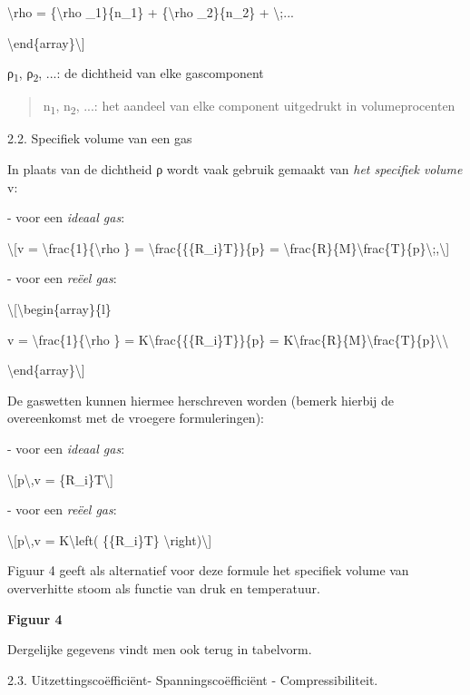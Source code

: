 \documentclass[]{article}
\begin{document}
\textbackslash{}rho = \{\textbackslash{}rho \_1\}\{n\_1\} +
\{\textbackslash{}rho \_2\}\{n\_2\} + \textbackslash{};...

\textbackslash{}end\{array\}\textbackslash{}{]}

ρ\textsubscript{1}, ρ\textsubscript{2}, ...: de dichtheid van elke
gascomponent

\begin{quote}
n\textsubscript{1}, n\textsubscript{2}, ...: het aandeel van elke
component uitgedrukt in volumeprocenten
\end{quote}

2.2. Specifiek volume van een gas

In plaats van de dichtheid ρ wordt vaak gebruik gemaakt van \emph{het
specifiek volume} v:

- voor een \emph{ideaal gas}:

\textbackslash{}{[}v = \textbackslash{}frac\{1\}\{\textbackslash{}rho \}
= \textbackslash{}frac\{\{\{R\_i\}T\}\}\{p\} =
\textbackslash{}frac\{R\}\{M\}\textbackslash{}frac\{T\}\{p\}\textbackslash{};,\textbackslash{}{]}

- voor een \emph{reëel gas}:

\textbackslash{}{[}\textbackslash{}begin\{array\}\{l\}

v = \textbackslash{}frac\{1\}\{\textbackslash{}rho \} =
K\textbackslash{}frac\{\{\{R\_i\}T\}\}\{p\} =
K\textbackslash{}frac\{R\}\{M\}\textbackslash{}frac\{T\}\{p\}\textbackslash{}\textbackslash{}

\textbackslash{}end\{array\}\textbackslash{}{]}

De gaswetten kunnen hiermee herschreven worden (bemerk hierbij de
overeenkomst met de vroegere formuleringen):

- voor een \emph{ideaal gas}:

\textbackslash{}{[}p\textbackslash{},v = \{R\_i\}T\textbackslash{}{]}

- voor een \emph{reëel gas}:

\textbackslash{}{[}p\textbackslash{},v = K\textbackslash{}left(
\{\{R\_i\}T\} \textbackslash{}right)\textbackslash{}{]}

Figuur 4 geeft als alternatief voor deze formule het specifiek volume
van oververhitte stoom als functie van druk en temperatuur.

\textbf{Figuur 4}

Dergelijke gegevens vindt men ook terug in tabelvorm.

2.3. Uitzettingscoëfficiënt- Spanningscoëfficiënt - Compressibiliteit.
\end{document}
